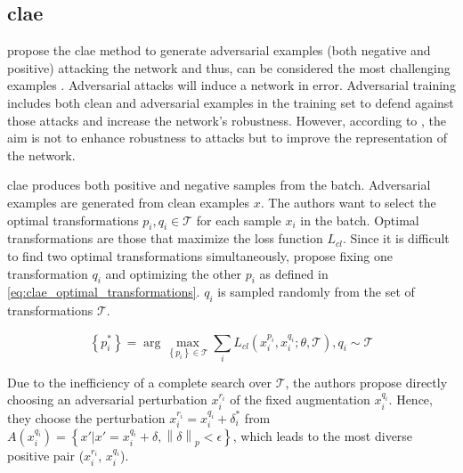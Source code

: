 \subsection{\acl{clae}}\label{subsec:adversarial_examples}


\citeauthor{ho_contrastive_2020} propose the \ac{clae} method to generate adversarial examples 
(both negative and positive) attacking the network and thus,
can be considered the most challenging examples \cite{ho_contrastive_2020}.
Adversarial attacks will induce a network in error.
Adversarial training includes both clean and adversarial examples in the training set to defend against those attacks and 
increase the network's robustness.
However, according to \citeauthor{ho_contrastive_2020}, the aim is not to enhance robustness to attacks 
but to improve the representation of the network.

\ac{clae} produces both positive and negative samples from the batch.
Adversarial examples are generated from clean examples $x$.
The authors want to select the optimal transformations $p_i, q_i \in \mathcal{T}$ for each sample $x_i$ in the batch.
Optimal transformations are those that maximize the loss function $L_{cl}$.
Since it is difficult to find two optimal transformations simultaneously, 
\citeauthor{ho_contrastive_2020} propose fixing one transformation $q_i$ and 
optimizing the other $p_i$ as defined in \eqref{eq:clae_optimal_transformations}.
$q_i$ is sampled randomly from the set of transformations $\mathcal{T}$.

\begin{equation}
    \left\{p^*_i\right\} = \arg\max_{\left\{p_i\right\} \in \mathcal{T}} \sum_{i}^{}L_{cl}(x_i^{p_i}, x_i^{q_i}; \theta, \mathcal{T}), q_i \sim \mathcal{T}
    \label{eq:clae_optimal_transformations}
\end{equation}

Due to the inefficiency of a complete search over $\mathcal{T}$, 
the authors propose directly choosing an adversarial perturbation $x^{r_i}_i$ of the fixed augmentation $x_i^{q_i}$.
Hence, they choose the perturbation $x^{r_i}_i = x^{q_i}_i + \delta^*_i$ from 
$A(x^{q_i}_i) = \left\{x' | x' = x^{q_i}_i + \delta, \left\|\delta\right\|_p < \epsilon\right\}$,
which leads to the most diverse positive pair ($x^{r_i}_i$, $x^{q_i}_i$).

